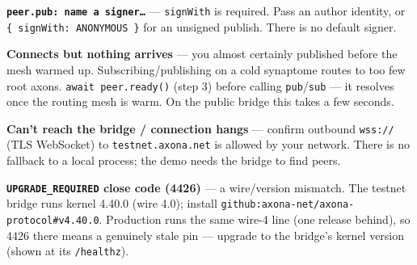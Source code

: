 \documentclass[
  nobib]{tufte-handout}
\begin{document}
\textbf{\texttt{peer.pub:\ name\ a\ signer…}} --- \texttt{signWith} is
required. Pass an author identity, or
\texttt{\{\ signWith:\ ANONYMOUS\ \}} for an unsigned publish. There is
no default signer.

\textbf{Connects but nothing arrives} --- you almost certainly published
before the mesh warmed up. Subscribing/publishing on a cold synaptome
routes to too few root axons. \texttt{await\ peer.ready()} (step 3)
before calling \texttt{pub}/\texttt{sub} --- it resolves once the
routing mesh is warm. On the public bridge this takes a few seconds.

\textbf{Can't reach the bridge / connection hangs} --- confirm outbound
\texttt{wss://} (TLS WebSocket) to \texttt{testnet.axona.net} is allowed
by your network. There is no fallback to a local process; the demo needs
the bridge to find peers.

\textbf{\texttt{UPGRADE\_REQUIRED} close code (4426)} --- a wire/version
mismatch. The testnet bridge runs kernel 4.40.0 (wire 4.0); install
\texttt{github:axona-net/axona-protocol\#v4.40.0}. Production runs the
same wire-4 line (one release behind), so 4426 there means a genuinely
stale pin --- upgrade to the bridge's kernel version (shown at its
\texttt{/healthz}).
\end{document}
